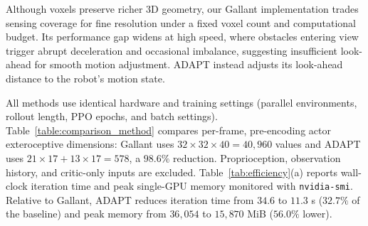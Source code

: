Although voxels preserve richer 3D geometry, our Gallant implementation trades sensing coverage for fine resolution under a fixed voxel count and computational budget. Its performance gap widens at high speed, where obstacles entering view trigger abrupt deceleration and occasional imbalance, suggesting insufficient look-ahead for smooth motion adjustment. ADAPT instead adjusts its look-ahead distance to the robot's motion state.

All methods use identical hardware and training settings (parallel environments, rollout length, PPO epochs, and batch settings). Table~\ref{table:comparison_method} compares per-frame, pre-encoding actor exteroceptive dimensions: Gallant uses $32\times32\times40=40{,}960$ values and ADAPT uses $21\times17+13\times17=578$, a $98.6\%$ reduction. Proprioception, observation history, and critic-only inputs are excluded.
Table~\ref{tab:efficiency}(a) reports wall-clock iteration time and peak single-GPU memory monitored with \texttt{nvidia-smi}. Relative to Gallant, ADAPT reduces iteration time from $34.6$ to $11.3$ s ($32.7\%$ of the baseline) and peak memory from $36{,}054$ to $15{,}870$ MiB ($56.0\%$ lower).

